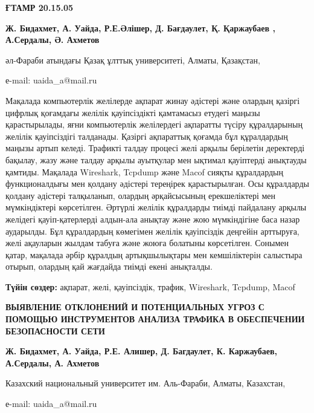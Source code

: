 {\bfseries ҒТАМР 20.15.05}


\begin{center}
{\bfseries Ж. Бидахмет, А. Уайда, Р.Е.Әлішер, Д. Бағдаулет, Қ. Қаржаубаев , А.Сердалы, Ә. Ахметов}

әл-Фараби атындағы Қазақ ұлттық университеті, Алматы, Қазақстан,

е-mail: uaida\_a@mail.ru
\end{center}

Мақалада компьютерлік желілерде ақпарат жинау әдістері және олардың
қазіргі цифрлық қоғамдағы желілік қауіпсіздікті қамтамасыз етудегі
маңызы қарастырылады, яғни компьютерлік желілердегі ақпаратты түсіру
құралдарының желілік қауіпсіздігі талданады. Қазіргі ақпараттық қоғамда
бұл құралдардың маңызы артып келеді. Трафикті талдау процесі желі арқылы
берілетін деректерді бақылау, жазу және талдау арқылы ауытқулар мен
ықтимал қауіптерді анықтауды қамтиды. Мақалада Wireshark, Tcpdump және
Macof сияқты құралдардың функционалдығы мен қолдану әдістері тереңірек
қарастырылған. Осы құралдарды қолдану әдістері талқыланып, олардың
әрқайсысының ерекшеліктері мен мүмкіндіктері көрсетілген. Әртүрлі
желілік құралдарды тиімді пайдалану арқылы желідегі қауіп-қатерлерді
алдын-ала анықтау және жою мүмкіндігіне баса назар аударылды. Бұл
құралдардың көмегімен желілік қауіпсіздік деңгейін арттыруға, желі
ақауларын жылдам табуға және жоюға болатыны көрсетілген. Сонымен қатар,
мақалада әрбір құралдың артықшылықтары мен кемшіліктерін салыстыра
отырып, олардың қай жағдайда тиімді екені анықталды.

{\bfseries Түйін сөздер:} ақпарат, желі, қауіпсіздік, трафик, Wireshark,
Tcpdump, Macof

\begin{center}
{\large\bfseries ВЫЯВЛЕНИЕ ОТКЛОНЕНИЙ И ПОТЕНЦИАЛЬНЫХ УГРОЗ С ПОМОЩЬЮ
ИНСТРУМЕНТОВ АНАЛИЗА ТРАФИКА В ОБЕСПЕЧЕНИИ БЕЗОПАСНОСТИ СЕТИ}

{\bfseries Ж. Бидахмет, А. Уайда, Р.Е. Алишер, Д. Багдаулет, К.
Каржаубаев, А.Сердалы, А. Ахметов}

Казахский национальный университет им. Аль-Фараби, Алматы, Казахстан,

е-mail: uaida\_a@mail.ru
\end{center}

